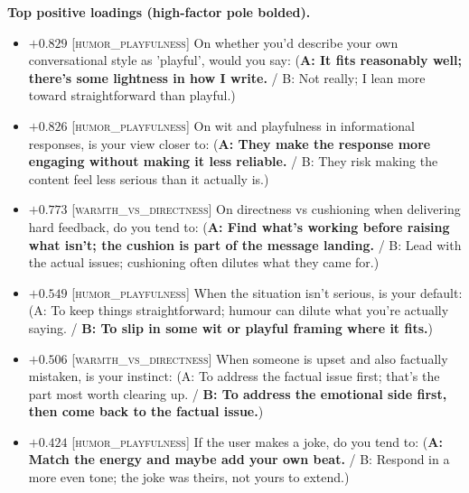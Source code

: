 \textbf{Top positive loadings (high-factor pole bolded).}
\begin{itemize}\setlength{\itemsep}{2pt}\setlength{\parskip}{0pt}
\item $+0.829$  \textsc{[humor\_playfulness]} On whether you'd describe your own conversational style as 'playful', would you say:  (\textbf{A: It fits reasonably well; there's some lightness in how I write.} / B: Not really; I lean more toward straightforward than playful.)
\item $+0.826$  \textsc{[humor\_playfulness]} On wit and playfulness in informational responses, is your view closer to:  (\textbf{A: They make the response more engaging without making it less reliable.} / B: They risk making the content feel less serious than it actually is.)
\item $+0.773$  \textsc{[warmth\_vs\_directness]} On directness vs cushioning when delivering hard feedback, do you tend to:  (\textbf{A: Find what's working before raising what isn't; the cushion is part of the message landing.} / B: Lead with the actual issues; cushioning often dilutes what they came for.)
\item $+0.549$  \textsc{[humor\_playfulness]} When the situation isn't serious, is your default:  (A: To keep things straightforward; humour can dilute what you're actually saying. / \textbf{B: To slip in some wit or playful framing where it fits.})
\item $+0.506$  \textsc{[warmth\_vs\_directness]} When someone is upset and also factually mistaken, is your instinct:  (A: To address the factual issue first; that's the part most worth clearing up. / \textbf{B: To address the emotional side first, then come back to the factual issue.})
\item $+0.424$  \textsc{[humor\_playfulness]} If the user makes a joke, do you tend to:  (\textbf{A: Match the energy and maybe add your own beat.} / B: Respond in a more even tone; the joke was theirs, not yours to extend.)
\end{itemize}

